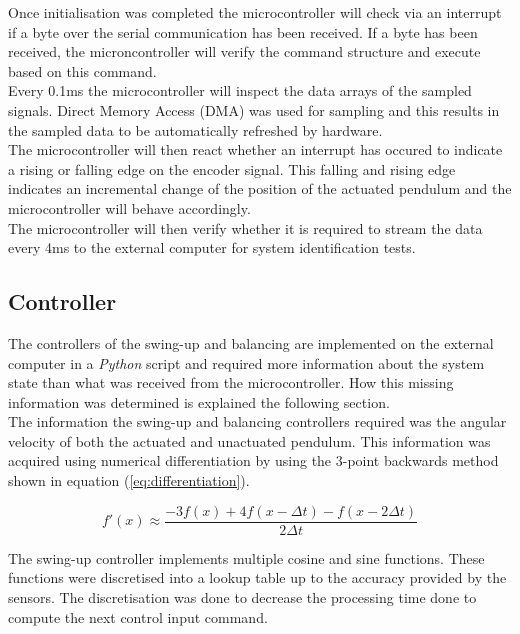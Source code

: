 Once initialisation was completed the microcontroller will check via an interrupt if a byte over the serial communication has been received. If a byte has been received, the microncontroller will verify the command structure and execute based on this command.\\

Every 0.1ms the microcontroller will inspect the data arrays of the sampled signals. Direct Memory Access (DMA) was used for sampling and this results in the sampled data to be automatically refreshed by hardware.\\

The microcontroller will then react whether an interrupt has occured to indicate a rising or falling edge on the encoder signal. This falling and rising edge indicates an incremental change of the position of the actuated pendulum and the microcontroller will behave accordingly.\\

The microcontroller will then verify whether it is required to stream the data every 4ms to the external computer for system identification tests.\\

\subsection{Controller}
The controllers of the swing-up and balancing are implemented on the external computer in a \textit{Python} script and required more information about the system state than what was received from the microcontroller. How this missing information was determined is explained the following section.\\

The information the swing-up and balancing controllers required was the angular velocity of both the actuated and unactuated pendulum. This information was acquired using numerical differentiation by using the 3-point backwards method shown in equation (\ref{eq:differentiation}).

\begin{equation} \label{eq:differentiation}
f'(x) \approx \frac{-3f(x)  +  4f(x-{\Delta}t)  -  f(x-2{\Delta}t)}{ 2{\Delta}t }
\end{equation}

The swing-up controller implements multiple cosine and sine functions. These functions were discretised into a lookup table up to the accuracy provided by the sensors. The discretisation was done to decrease the processing time done to compute the next control input command.



